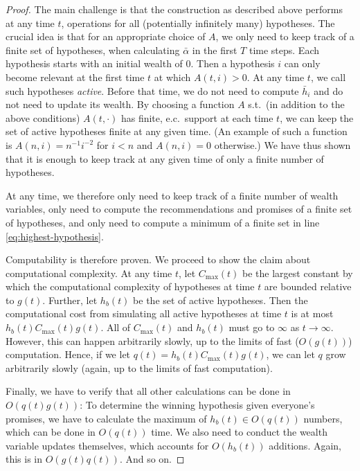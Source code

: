 \documentclass[submission,copyright,creativecommons]{eptcs}
\begin{document}
\begin{proof}
The main challenge is that the construction as described above performs at any time $t$, operations for all (potentially infinitely many) hypotheses.
The crucial idea is that for an appropriate choice of $A$, we only need to keep track of a finite set of hypotheses, when calculating $\bar \alpha$ in the first $T$ time steps. Each hypothesis starts with an initial wealth of $0$. Then a hypothesis $i$ can only become relevant at the first time $t$ at which $A(t,i)>0$. At any time $t$, we call such hypotheses \textit{active}. Before that time, we do not need to compute $\bar h_i$ and do not need to update its wealth. By choosing a function $A$ s.t.\ (in addition to the above conditions) $A(t,\cdot)$ has finite, e.c.\ support at each time $t$, we can keep the set of active hypotheses finite at any given time. (An example of such a function is $A(n,i) =  n^{-1}i^{-2}$ for $i<n$ and $A(n,i) =0$ otherwise.) We have thus shown that it is enough to keep track at any given time of only a finite number of hypotheses.

At any time, we therefore only need to keep track of a finite number of wealth variables, only need to compute the recommendations and promises of a finite set of hypotheses, and only need to compute a minimum of a finite set in line \ref{eq:highest-hypothesis}.

Computability is therefore proven. We proceed to show the claim about computational complexity. At any time $t$, let $C_{\max}(t)$ be the largest constant by which the computational complexity of hypotheses at time $t$ are bounded relative to $g(t)$. Further, let $h_b(t)$ be the set of active hypotheses. Then the computational cost from simulating all active hypotheses at time $t$ is at most $h_b(t)C_{\max}(t)g(t)$.
All of $C_{\max}(t)$ and $h_b(t)$ must go to $\infty$ as $t\rightarrow \infty$. However, this can happen arbitrarily slowly, up to the limits of fast ($O(g(t))$) computation.
Hence, if we let $q(t)=h_b(t)C_{\max}(t)g(t)$, we can let $q$ grow arbitrarily slowly (again, up to the limits of fast computation).

Finally, we have to verify that all other calculations can be done in $O(q(t)g(t))$: To determine the winning hypothesis given everyone's promises, we have to calculate the maximum of $h_b(t)\in O(q(t))$ numbers, which can be done in $O(q(t))$ time. We also need to conduct the wealth variable updates themselves, which accounts for $O(h_b(t))$ additions. Again, this is in $O(g(t)q(t))$. And so on.
\end{proof}
\end{document}
